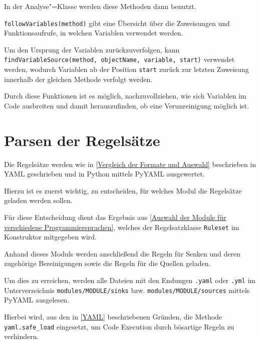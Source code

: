             In der Analyse"=Klasse werden diese Methoden dann benutzt.

            \lstinline{followVariables(method)} gibt eine Übersicht über die Zuweisungen und
            Funktionsaufrufe,
            in welchen Variablen verwendet werden.

            Um den Ursprung der Variablen zurückzuverfolgen,
            kann
            \lstinline{findVariableSource(method, objectName, variable, start)} verwendet werden,
            wodurch Variablen ab der Position
            \lstinline{start} zurück zur letzten Zuweisung innerhalb der gleichen Methode verfolgt werden.

            Durch diese Funktionen ist es möglich,
            nachzuvollziehen,
            wie sich Variablen im Code ausbreiten und
            damit herauszufinden,
            ob eine Verunreinigung möglich ist.

    \section{Parsen der Regelsätze}\label{Parsen der Regelsätze}
        Die Regelsätze werden wie
        in
        \vref{Vergleich der Formate und Auswahl} beschrieben in
        \gls{YAML} geschrieben und
        in Python mittels PyYAML ausgewertet.

        Hierzu ist es zuerst wichtig,
        zu entscheiden,
        für welches Modul die Regelsätze geladen werden sollen.

        Für diese Entscheidung dient das Ergebnis aus
        \vref{Auswahl der Module für verschiedene Programmiersprachen},
        welches der Regelsatzklasse
        \lstinline{Ruleset} im Konstruktor mitgegeben wird.

        Anhand dieses Moduls werden anschließend die Regeln für Senken und
        deren zugehörige Bereinigungen sowie
        die Regeln für die Quellen geladen.

        Um dies zu erreichen,
        werden alle Dateien mit den Endungen
        \lstinline{.yaml} oder
        \lstinline{.yml} im Unterverzeichnis
        \lstinline{modules/MODULE/sinks} bzw.
        \lstinline{modules/MODULE/sources} mittels PyYAML ausgelesen.

        Hierbei wird,
        aus den in
        \vref{YAML} beschriebenen Gründen,
        die Methode
        \lstinline{yaml.safe_load} eingesetzt,
        um Code Execution durch bösartige Regeln zu verhindern.

